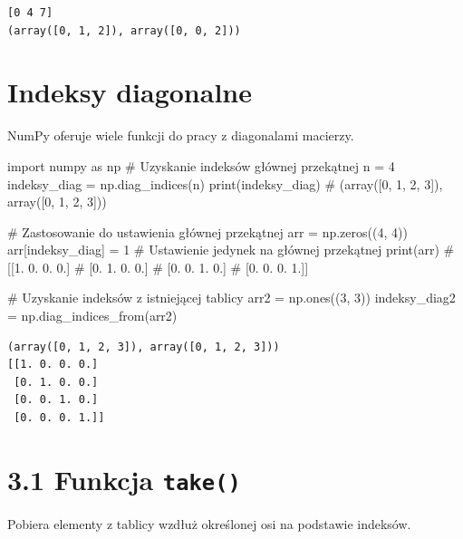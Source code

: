 \documentclass[
  letterpaper,
  DIV=11,
  numbers=noendperiod]{scrreprt}
\newenvironment{Shaded}{\begin{snugshade}}{\end{snugshade}}
\newcommand{\BuiltInTok}[1]{\textcolor[rgb]{0.00,0.23,0.31}{#1}}
\newcommand{\CommentTok}[1]{\textcolor[rgb]{0.37,0.37,0.37}{#1}}
\newcommand{\DecValTok}[1]{\textcolor[rgb]{0.68,0.00,0.00}{#1}}
\newcommand{\ImportTok}[1]{\textcolor[rgb]{0.00,0.46,0.62}{#1}}
\newcommand{\NormalTok}[1]{\textcolor[rgb]{0.00,0.23,0.31}{#1}}
\newcommand{\OperatorTok}[1]{\textcolor[rgb]{0.37,0.37,0.37}{#1}}
\begin{document}
\begin{verbatim}
[0 4 7]
(array([0, 1, 2]), array([0, 0, 2]))
\end{verbatim}

\section{Indeksy diagonalne}\label{indeksy-diagonalne}

NumPy oferuje wiele funkcji do pracy z diagonalami macierzy.

\begin{Shaded}
\begin{Highlighting}[]
\ImportTok{import}\NormalTok{ numpy }\ImportTok{as}\NormalTok{ np}
\CommentTok{\# Uzyskanie indeksów głównej przekątnej}
\NormalTok{n }\OperatorTok{=} \DecValTok{4}
\NormalTok{indeksy\_diag }\OperatorTok{=}\NormalTok{ np.diag\_indices(n)}
\BuiltInTok{print}\NormalTok{(indeksy\_diag)  }\CommentTok{\# (array([0, 1, 2, 3]), array([0, 1, 2, 3]))}

\CommentTok{\# Zastosowanie do ustawienia głównej przekątnej}
\NormalTok{arr }\OperatorTok{=}\NormalTok{ np.zeros((}\DecValTok{4}\NormalTok{, }\DecValTok{4}\NormalTok{))}
\NormalTok{arr[indeksy\_diag] }\OperatorTok{=} \DecValTok{1}  \CommentTok{\# Ustawienie jedynek na głównej przekątnej}
\BuiltInTok{print}\NormalTok{(arr)}
\CommentTok{\# [[1. 0. 0. 0.]}
\CommentTok{\#  [0. 1. 0. 0.]}
\CommentTok{\#  [0. 0. 1. 0.]}
\CommentTok{\#  [0. 0. 0. 1.]]}

\CommentTok{\# Uzyskanie indeksów z istniejącej tablicy}
\NormalTok{arr2 }\OperatorTok{=}\NormalTok{ np.ones((}\DecValTok{3}\NormalTok{, }\DecValTok{3}\NormalTok{))}
\NormalTok{indeksy\_diag2 }\OperatorTok{=}\NormalTok{ np.diag\_indices\_from(arr2)}
\end{Highlighting}
\end{Shaded}

\begin{verbatim}
(array([0, 1, 2, 3]), array([0, 1, 2, 3]))
[[1. 0. 0. 0.]
 [0. 1. 0. 0.]
 [0. 0. 1. 0.]
 [0. 0. 0. 1.]]
\end{verbatim}

\section{\texorpdfstring{3.1 Funkcja
\texttt{take()}}{3.1 Funkcja take()}}\label{funkcja-take}

Pobiera elementy z tablicy wzdłuż określonej osi na podstawie indeksów.
\end{document}
